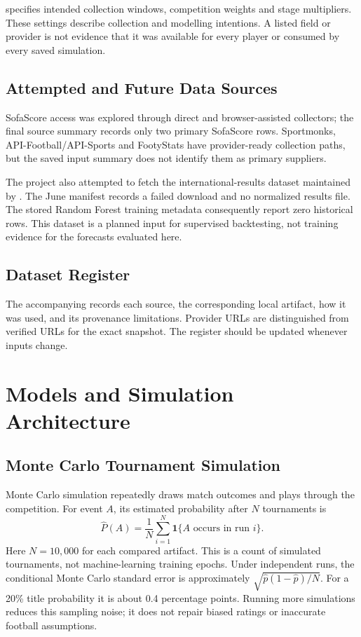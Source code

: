 \documentclass[11pt,a4paper]{article}
\begin{document}
 specifies intended collection windows,
competition weights and stage multipliers. These settings describe collection
and modelling intentions. A listed field or provider is not evidence that it
was available for every player or consumed by every saved simulation.
\subsection{Attempted and Future Data Sources}
SofaScore access was explored through direct and browser-assisted collectors;
the final source summary records only two primary SofaScore rows. Sportmonks,
API-Football/API-Sports and FootyStats have provider-ready collection paths,
but the saved input summary does not identify them as primary suppliers.

The project also attempted to fetch the international-results dataset maintained
by  \cite{data-historical}. The June manifest
records a failed download and no normalized results file. The stored Random
Forest training metadata consequently report zero historical rows. This
dataset is a planned input for supervised backtesting, not training evidence
for the forecasts evaluated here.
\subsection{Dataset Register}
The accompanying  records each source, the corresponding
local artifact, how it was used, and its provenance limitations. Provider URLs
are distinguished from verified URLs for the exact snapshot. The register
should be updated whenever inputs change.
\clearpage

\section{Models and Simulation Architecture}
\label{sec:models}
\subsection{Monte Carlo Tournament Simulation}
Monte Carlo simulation repeatedly draws match outcomes and plays through the
competition. For event $A$, its estimated probability after $N$ tournaments is
\begin{equation}
\widehat{P}(A)=\frac{1}{N}\sum_{i=1}^{N}\mathbf{1}\{A\text{ occurs in run }i\}.
\end{equation}
Here $N=10{,}000$ for each compared artifact. This is a count of simulated
tournaments, not machine-learning training epochs. Under independent runs,
the conditional Monte Carlo standard error is approximately
$\sqrt{\widehat p(1-\widehat p)/N}$. For a 20\% title probability it is about
0.4 percentage points. Running more simulations reduces this sampling noise;
it does not repair biased ratings or inaccurate football assumptions.
\end{document}
